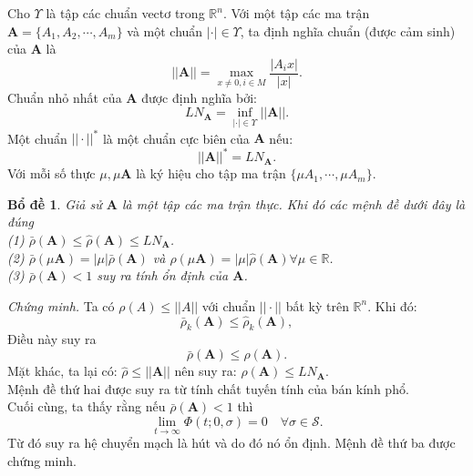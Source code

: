 \documentclass[14pt,a4paper,oneside]{report}		%
\newtheorem{lemma}[theorem]{Bổ đề}
\theoremstyle{definition}
\begin{document}
Cho $\Upsilon$ là tập các chuẩn vectơ trong $\mathbb{R}^n$. Với một tập các ma trận $\mathbf{A}=\{A_1,A_2,\cdots,A_m\}$ và một chuẩn $|\cdot|\in\Upsilon$, ta định nghĩa chuẩn (được cảm sinh) của $\mathbf{A}$ là
$$||\mathbf{A}||=\max_{x\neq 0,i\in M}\frac{|A_ix|}{|x|}.$$
Chuẩn nhỏ nhất của $\mathbf{A}$ được định nghĩa bởi:
$$LN_\mathbf{A}=\inf_{|\cdot|\in\Upsilon}||\mathbf{A}||.$$
Một chuẩn $||\cdot||^*$ là một chuẩn cực biên của $\mathbf{A}$ nếu:
$$||\mathbf{A}||^*=LN_\mathbf{A}.$$
Với mỗi số thực $\mu, \mu\mathbf{A}$ là ký hiệu cho tập ma trận $\{\mu A_1,\cdots,\mu A_m\}$.
\begin{lemma} \label{le2-22}
Giả sử $\mathbf{A}$ là một tập các ma trận thực. Khi đó các mệnh đề dưới đây là đúng\\
(1) $\bar{\rho}(\mathbf{A})\leq\widehat{\rho}(\mathbf{A})\leq LN_\mathbf{A}$.\\
(2) $\bar{\rho}(\mu\mathbf{A})=|\mu|\bar{\rho}(\mathbf{A})$ và $\widehat{\rho}(\mu\mathbf{A})=|\mu|\widehat{\rho}(\mathbf{A}) \forall \mu\in\mathbb{R}$.\\
(3) $\bar{\rho}(\mathbf{A})<1$ suy ra tính ổn định của $\mathbf{A}$.
\end{lemma}
\textit{Chứng minh.} Ta có $\rho(A)\leq ||A||$ với chuẩn $||\cdot||$ bất kỳ trên $\mathbb{R}^n$. Khi đó:
$$\bar{\rho}_k(\mathbf{A})\leq\widehat{\rho}_k(\mathbf{A}),$$
Điều này suy ra
$$\bar{\rho}(\mathbf{A})\leq\widehat{\rho}(\mathbf{A}).$$
Mặt khác, ta lại có: $\widehat{\rho}\leq ||\mathbf{A}||$ nên suy ra: $\widehat{\rho}(\mathbf{A})\leq LN_\mathbf{A}$.\\
Mệnh đề thứ hai được suy ra từ tính chất tuyến tính của bán kính phổ.\\
Cuối cùng, ta thấy rằng nếu $\bar{\rho}(\mathbf{A})<1$ thì
$$\lim_{t\rightarrow\infty}\Phi(t;0,\sigma)=0\quad\forall\sigma\in\mathcal{S}.$$
Từ đó suy ra hệ chuyển mạch là hút và do đó nó ổn định. Mệnh đề thứ ba được chứng minh.
\end{document}

